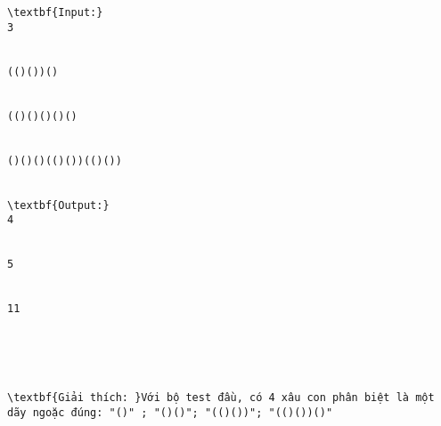 \begin{verbatim}
\textbf{Input:}
3


(()())()


(()()()()()


()()()(()())(()())


\textbf{Output:}
4


5


11





\textbf{Giải thích: }Với bộ test đầu, có 4 xâu con phân biệt là một dãy ngoặc đúng: "()" ; "()()"; "(()())"; "(()())()"


\end{verbatim}